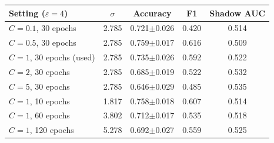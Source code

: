 \begin{tabular}{@{}lcccc@{}}
\toprule
Setting ($\varepsilon{=}4$) & $\sigma$ & Accuracy & F1 & Shadow AUC \\
\midrule
$C{=}0.1$, 30 epochs & 2.785 & 0.721$\pm$0.026 & 0.420 & 0.514 \\
$C{=}0.5$, 30 epochs & 2.785 & 0.759$\pm$0.017 & 0.616 & 0.509 \\
$C{=}1$, 30 epochs (used) & 2.785 & 0.735$\pm$0.026 & 0.592 & 0.522 \\
$C{=}2$, 30 epochs & 2.785 & 0.685$\pm$0.019 & 0.522 & 0.532 \\
$C{=}5$, 30 epochs & 2.785 & 0.646$\pm$0.029 & 0.485 & 0.535 \\
$C{=}1$, 10 epochs & 1.817 & 0.758$\pm$0.018 & 0.607 & 0.514 \\
$C{=}1$, 60 epochs & 3.802 & 0.712$\pm$0.017 & 0.535 & 0.518 \\
$C{=}1$, 120 epochs & 5.278 & 0.692$\pm$0.027 & 0.559 & 0.525 \\
\bottomrule
\end{tabular}

